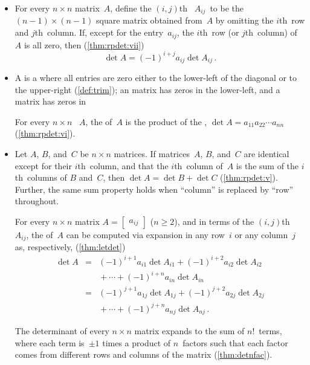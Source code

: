 \begin{itemize}
\item For every \(n\times n\) matrix~\(A\),
define the \((i,j)\)th~ \(A_{ij}\)~to be the \((n-1)\times(n-1)\) square matrix obtained from~\(A\) by omitting the \(i\)th~row and \(j\)th~column.  
If, except for the entry~\(a_{ij}\), the \(i\)th~row (or \(j\)th~column) of~\(A\) is all zero, then (\cref{thm:rpdet:vii})
\begin{equation*}
\det A=(-1)^{i+j}a_{ij}\det A_{ij}\,.
\end{equation*}

\item A  is a  where all entries are zero either to the lower-left of the diagonal or to the upper-right (\cref{def:trim}); an  matrix has zeros in the lower-left, and a  matrix has zeros in 

\itemme For every \(n\times n\) ~\(A\),
the  of~\(A\) is the product of the , \(\det A=a_{11}a_{22}\cdots a_{nn}\) (\cref{thm:rpdet:vi}).

\item Let \(A\), \(B\), and~\(C\) be \(n\times n\) matrices.
If matrices~\(A\), \(B\), and~\(C\) are identical except for their \(i\)th~column, and that the \(i\)th~column of~\(A\) is the sum of the \(i\)th~columns of \(B\) and~\(C\), then \(\det A=\det B+\det C\) (\cref{thm:rpdet:v}).
Further, the same sum property holds when ``column'' is replaced by ``row'' throughout.

\itemme For every \(n\times n\) matrix \(A=\begin{bmatrix} a_{ij} \end{bmatrix}\) (\(n\geq2\)), and in terms of the \((i,j)\)th ~\(A_{ij}\), the  of~\(A\) can be computed via expansion in any row~\(i\) or any column~\(j\) as, respectively, (\cref{thm:letdet})
\begin{eqnarray*}
\det A
&=&(-1)^{i+1}a_{i1}\det A_{i1}
+(-1)^{i+2}a_{i2}\det A_{i2}
\nonumber\\&&{}
+\cdots+(-1)^{i+n}a_{in}\det A_{in}
\nonumber\\&=&(-1)^{j+1}a_{1j}\det A_{1j}
+(-1)^{j+2}a_{2j}\det A_{2j}
\nonumber\\&&{}
+\cdots+(-1)^{j+n}a_{nj}\det A_{nj}\,.
\end{eqnarray*}

\itemme The determinant of every \(n\times n\) matrix expands to the sum of \(n!\)~terms, where each term is~\(\pm1\) times a product of \(n\)~factors such that each factor comes from different rows and columns of the matrix (\cref{thm:detnfac}).



\end{itemize}



\makeanswers
